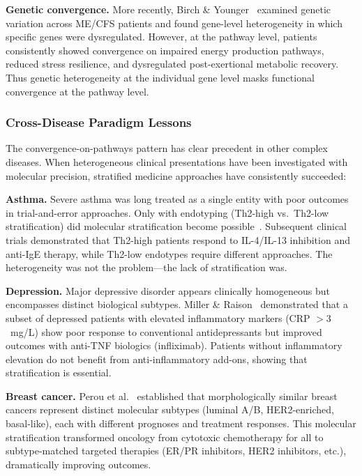 \textbf{Genetic convergence.} More recently, Birch \& Younger~\cite{Birch2025precision} examined genetic variation across ME/CFS patients and found gene-level heterogeneity in which specific genes were dysregulated. However, at the pathway level, patients consistently showed convergence on impaired energy production pathways, reduced stress resilience, and dysregulated post-exertional metabolic recovery. Thus genetic heterogeneity at the individual gene level masks functional convergence at the pathway level.

\subsubsection*{Cross-Disease Paradigm Lessons}

The convergence-on-pathways pattern has clear precedent in other complex diseases. When heterogeneous clinical presentations have been investigated with molecular precision, stratified medicine approaches have consistently succeeded:

\textbf{Asthma.} Severe asthma was long treated as a single entity with poor outcomes in trial-and-error approaches. Only with endotyping (Th2-high vs.\ Th2-low stratification) did molecular stratification become possible~\cite{Woodruff2009asthma}. Subsequent clinical trials demonstrated that Th2-high patients respond to IL-4/IL-13 inhibition and anti-IgE therapy, while Th2-low endotypes require different approaches. The heterogeneity was not the problem---the lack of stratification was.

\textbf{Depression.} Major depressive disorder appears clinically homogeneous but encompasses distinct biological subtypes. Miller \& Raison~\cite{MillerRaison2023depression} demonstrated that a subset of depressed patients with elevated inflammatory markers (CRP $> 3$~mg/L) show poor response to conventional antidepressants but improved outcomes with anti-TNF biologics (infliximab). Patients without inflammatory elevation do not benefit from anti-inflammatory add-ons, showing that stratification is essential.

\textbf{Breast cancer.} Perou et al.~\cite{Perou2000breast} established that morphologically similar breast cancers represent distinct molecular subtypes (luminal A/B, HER2-enriched, basal-like), each with different prognoses and treatment responses. This molecular stratification transformed oncology from cytotoxic chemotherapy for all to subtype-matched targeted therapies (ER/PR inhibitors, HER2 inhibitors, etc.), dramatically improving outcomes.

